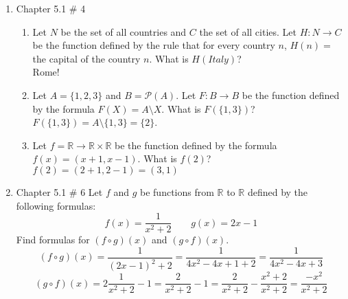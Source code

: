 \documentclass[10pt,a4paper]{article}
\begin{document}
\begin{enumerate}
\item Chapter 5.1 \# 4
\begin{enumerate}
\item Let $N$ be the set of all countries and $C$ the set of all cities. Let $H : N \to C$ be the function defined by the rule that for every country $n$, $H(n) = $the capital of the country $n$. What is $H(Italy)$?\\
Rome!
\item Let $A=\{1,2,3\} $ and $B= \mathcal{P}(A)$. Let $F: B \to B $ be the function defined by the formula $F(X) = A\setminus X$. What is $F(\{1,3\})$?\\
$F(\{1,3\})= A \setminus \{1,3\}= \{2\}$.
\item Let $f= \mathbb{R} \to \mathbb{R}\times \mathbb{R}$ be the function defined by the formula $f(x)= (x+1,x-1)$. What is $f(2)$?\\
$f(2)=(2+1,2-1)=(3,1)$
\end{enumerate}
\item Chapter 5.1 \# 6 Let $f$ and $g$ be functions from $\mathbb{R}$ to $\mathbb{R}$ defined by the following formulas:
$$f(x) = \frac{1}{x^2 +2}  \ \ \ \ \ \ \ \  \       g(x)=2x-1$$
Find formulas for $(f \circ g)(x)$ and $(g \circ f)(x)$.\\
$$(f \circ g)(x)= \frac{1}{(2x-1)^2 +2}=\frac{1}{4x^2-4x+1+2}=\frac{1}{4x^2-4x+3}$$
$$(g\circ f)(x)= 2\frac{1}{x^2 +2} -1=\frac{2}{x^2+2}-1=\frac{2}{x^2+2}-\frac{x^2+2}{x^2+2}=\frac{-x^2}{x^2+2}$$
\end{enumerate}
\end{document}
